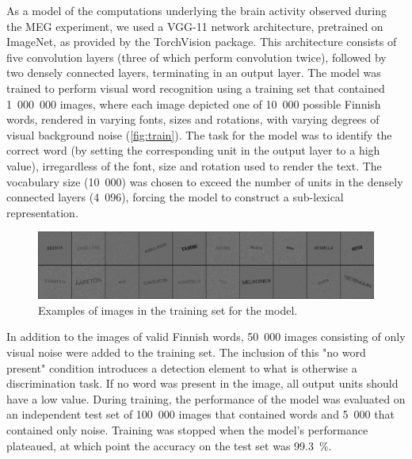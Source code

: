 \documentclass[a4paper, 10pt]{vanvliet_paper}
\begin{document}
As a model of the computations underlying the brain activity observed during the \gls{MEG} experiment, we used a \textsc{VGG}-11\cite{Szegedy2015} network architecture, pretrained on ImageNet\cite{Russakovsky2015}, as provided by the TorchVision package\cite{Marcel2010}.
This architecture consists of five convolution layers (three of which perform convolution twice), followed by two densely connected layers, terminating in an output layer.
The model was trained to perform visual word recognition using a training set that contained 1~000~000 images, where each image depicted one of 10~000 possible Finnish words, rendered in varying fonts, sizes and rotations, with varying degrees of visual background noise (\autoref{fig:train}).
The task for the model was to identify the correct word (by setting the corresponding unit in the output layer to a high value), irregardless of the font, size and rotation used to render the text.
The vocabulary size (10~000) was chosen to exceed the number of units in the densely connected layers (4~096), forcing the model to construct a sub-lexical representation.

\begin{figure}[b]
    \includegraphics[width=\textwidth]{train.png}
    \caption{Examples of images in the training set for the model.}\label{fig:train}
\end{figure}

In addition to the images of valid Finnish words, 50~000 images consisting of only visual noise were added to the training set.
The inclusion of this "no word present" condition introduces a detection element to what is otherwise a discrimination task.
If no word was present in the image, all output units should have a low value.
During training, the performance of the model was evaluated on an independent test set of 100~000 images that contained words and 5~000 that contained only noise.
Training was stopped when the model's performance plateaued, at which point the accuracy on the test set was \SI{99.3}{\percent}.
\end{document}
